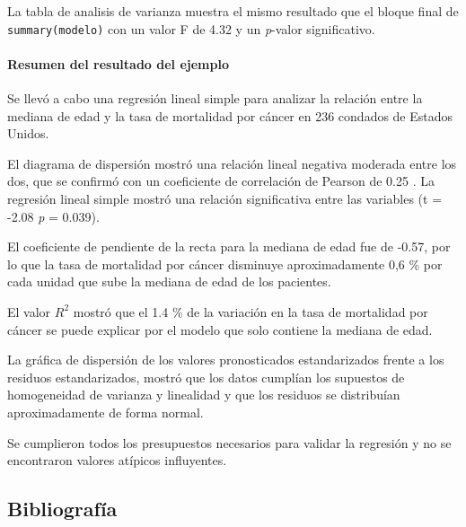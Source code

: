 \documentclass[
  letterpaper,
  DIV=11,
  numbers=noendperiod]{scrartcl}
\let\oldparagraph\paragraph
\renewcommand{\paragraph}[1]{\oldparagraph{#1}\mbox{}}
\begin{document}
La tabla de analisis de varianza muestra el mismo resultado que el
bloque final de \texttt{summary(modelo)} con un valor F de 4.32 y un
\emph{p}-valor significativo.

\paragraph{Resumen del resultado del
ejemplo}\label{resumen-del-resultado-del-ejemplo}

Se llevó a cabo una regresión lineal simple para analizar la relación
entre la mediana de edad y la tasa de mortalidad por cáncer en 236
condados de Estados Unidos.

El diagrama de dispersión mostró una relación lineal negativa moderada
entre los dos, que se confirmó con un coeficiente de correlación de
Pearson de 0.25 . La regresión lineal simple mostró una relación
significativa entre las variables (t = -2.08 \emph{p} = 0.039).

El coeficiente de pendiente de la recta para la mediana de edad fue de
-0.57, por lo que la tasa de mortalidad por cáncer disminuye
aproximadamente 0,6 \% por cada unidad que sube la mediana de edad de
los pacientes.

El valor \(R^2\) mostró que el 1.4 \% de la variación en la tasa de
mortalidad por cáncer se puede explicar por el modelo que solo contiene
la mediana de edad.

La gráfica de dispersión de los valores pronosticados estandarizados
frente a los residuos estandarizados, mostró que los datos cumplían los
supuestos de homogeneidad de varianza y linealidad y que los residuos se
distribuían aproximadamente de forma normal.

Se cumplieron todos los presupuestos necesarios para validar la
regresión y no se encontraron valores atípicos influyentes.

\subsection*{Bibliografía}\label{bibliografuxeda}
\end{document}
